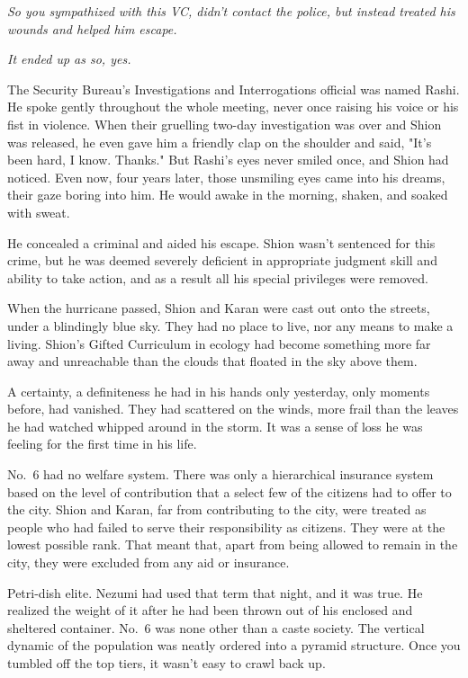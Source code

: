 \emph{So you sympathized with this VC, didn't contact the police, but instead
treated his wounds and helped him escape.}

\emph{It ended up as so, yes.}

The Security Bureau's Investigations and Interrogations official was
named Rashi. He spoke gently throughout the whole meeting, never once
raising his voice or his fist in violence. When their gruelling two-day
investigation was over and Shion was released, he even gave him a
friendly clap on the shoulder and said, "It's been hard, I know.
Thanks." But Rashi's eyes never smiled once, and Shion had noticed. Even
now, four years later, those unsmiling eyes came into his dreams, their
gaze boring into him. He would awake in the morning, shaken, and soaked
with sweat.

He concealed a criminal and aided his escape. Shion wasn't sentenced for
this crime, but he was deemed severely deficient in appropriate judgment
skill and ability to take action, and as a result all his special
privileges were removed.

When the hurricane passed, Shion and Karan were cast out onto the
streets, under a blindingly blue sky. They had no place to live, nor any
means to make a living. Shion's Gifted Curriculum in ecology had become
something more far away and unreachable than the clouds that floated in
the sky above them.

A certainty, a definiteness he had in his hands only yesterday, only
moments before, had vanished. They had scattered on the winds, more
frail than the leaves he had watched whipped around in the storm. It was
a sense of loss he was feeling for the first time in his life.

No.~6 had no welfare system. There was only a hierarchical insurance
system based on the level of contribution that a select few of the
citizens had to offer to the city. Shion and Karan, far from
contributing to the city, were treated as people who had failed to serve
their responsibility as citizens. They were at the lowest possible rank.
That meant that, apart from being allowed to remain in the city, they
were excluded from any aid or insurance.

Petri-dish elite. Nezumi had used that term that night, and it was true.
He realized the weight of it after he had been thrown out of his
enclosed and sheltered container. No.~6 was none other than a caste
society. The vertical dynamic of the population was neatly ordered into
a pyramid structure. Once you tumbled off the top tiers, it wasn't easy
to crawl back up.


